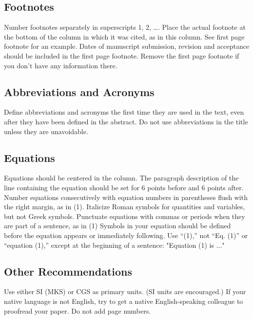 \documentclass{ijisa}
\begin{document}
\subsection{Footnotes}
Number footnotes separately in superscripts 1, 2, …. Place the actual footnote at the bottom of the column in which it was cited, as in this column. See first page footnote for an example. 
Dates of manuscript submission, revision and acceptance should be included in the first page footnote. Remove the first page footnote if you don’t have any information there.
\subsection{Abbreviations and Acronyms}
Define abbreviations and acronyms the first time they are used in the text, even after they have been defined in the abstract. Do not use abbreviations in the title unless they are unavoidable.
\subsection{Equations}
Equations should be centered in the column. The paragraph description of the line containing the equation should be set for 6 points before and 6 points after. Number equations consecutively with equation numbers in parentheses flush with the right margin, as in (1). Italicize Roman symbols for quantities and variables, but not Greek symbols. Punctuate equations with commas or periods when they are part of a sentence, as in	(1)
Symbols in your equation should be defined before the equation appears or immediately following. Use “(1),” not “Eq. (1)” or “equation (1),” except at the beginning of a sentence: "Equation (1) is ..."


\subsection{Other Recommendations}
Use either SI (MKS) or CGS as primary units. (SI units are encouraged.) If your native language is not English, try to get a native English-speaking colleague to proofread your paper. Do not add page numbers.
\end{document}
